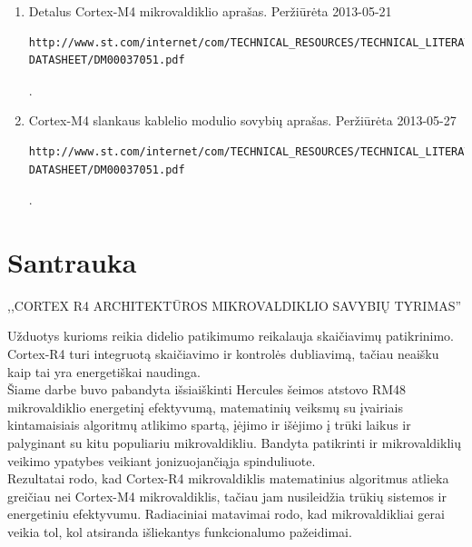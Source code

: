 \documentclass[a4paper, 12pt]{article} %
\newcommand{\studentas}{Mindaugas Kurmauskas} %
\newcommand{\pavadinimas}{Cortex R4 architekt\={u}ros mikrovaldiklio savybi\k{u} tyrimas} %
\begin{document}
\begin{onehalfspacing}
\begin{enumerate}
\item Detalus Cortex-M4 mikrovaldiklio apra\v{s}as. Per\v{z}i\={u}r\.{e}ta 2013-05-21 \begin{verbatim}http://www.st.com/internet/com/TECHNICAL_RESOURCES/TECHNICAL_LITERATURE/
DATASHEET/DM00037051.pdf\end{verbatim}. 
\item Cortex-M4 slankaus kablelio modulio sovybi\k{u} apra\v{s}as. Per\v{z}i\={u}r\.{e}ta 2013-05-27 \begin{verbatim}http://www.st.com/internet/com/TECHNICAL_RESOURCES/TECHNICAL_LITERATURE/
DATASHEET/DM00037051.pdf\end{verbatim}. 
\end{enumerate}


\newpage

\section*{Santrauka}




\begin{center}


\MakeUppercase{,,\pavadinimas''}\\

\end{center}

U\v{z}duotys kurioms reikia didelio patikimumo reikalauja skai\v{c}iavim\k{u} patikrinimo. Cortex-R4 turi integruot\k{a} skai\v{c}iavimo ir kontrol\.es dubliavim\k{a}, ta\v{c}iau neai\v{s}ku kaip tai yra energeti\v{s}kai naudinga. \\
\indent
\v{S}iame darbe buvo pabandyta i\v{s}siai\v{s}kinti Hercules \v{s}eimos atstovo RM48 mikrovaldiklio energetin\k{i} efektyvum\k{a}, matematini\k{u} veiksm\k{u} su \k{i}vairiais kintamaisiais algoritm\k{u} atlikimo spart\k{a}, \k{i}\.{e}jimo ir i\v{s}\.{e}jimo \k{i} tr\={u}ki laikus ir palyginant su kitu populiariu mikrovaldikliu. Bandyta patikrinti ir mikrovaldikli\k{u} veikimo ypatybes veikiant jonizuojan\v{c}i\k{a}ja spinduliuote. \\
\indent
Rezultatai rodo, kad Cortex-R4 mikrovaldiklis matematinius algoritmus atlieka grei\v{c}iau nei Cortex-M4 mikrovaldiklis, ta\v{c}iau jam nusileid\v{z}ia tr\={u}ki\k{u} sistemos ir energetiniu efektyvumu. Radiaciniai matavimai rodo, kad mikrovaldikliai gerai veikia tol, kol atsiranda i\v{s}liekantys funkcionalumo pa\v{z}eidimai.  




\end{onehalfspacing}
\end{document}
